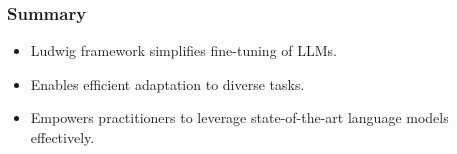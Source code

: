 
\begin{frame}[fragile]\frametitle{Summary}
    \begin{itemize}
        \item Ludwig framework simplifies fine-tuning of LLMs.
        \item Enables efficient adaptation to diverse tasks.
        \item Empowers practitioners to leverage state-of-the-art language models effectively.
    \end{itemize}
\end{frame}
